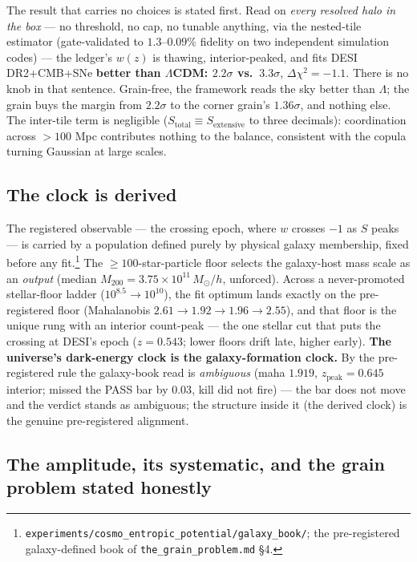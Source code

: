 \documentclass[11pt,a4paper]{article}
\begin{document}
The result that carries no choices is stated first. Read on \emph{every resolved halo in the box} --- no threshold, no cap, no tunable anything, via the nested-tile estimator (gate-validated to $1.3$--$0.09\%$ fidelity on two independent simulation codes) --- the ledger's $w(z)$ is thawing, interior-peaked, and fits DESI DR2+CMB+SNe \textbf{better than $\Lambda$CDM: $2.2\sigma$ vs.\ $3.3\sigma$}, $\Delta\chi^2 = -1.1$. There is no knob in that sentence. Grain-free, the framework reads the sky better than $\Lambda$; the grain buys the margin from $2.2\sigma$ to the corner grain's $1.36\sigma$, and nothing else. The inter-tile term is negligible ($S_{\text{total}} \equiv S_{\text{extensive}}$ to three decimals): coordination across $>100$ Mpc contributes nothing to the balance, consistent with the copula turning Gaussian at large scales.

\subsection*{The clock is derived}

The registered observable --- the crossing epoch, where $w$ crosses $-1$ as $S$ peaks --- is carried by a population defined purely by physical galaxy membership, fixed before any fit.\footnote{\texttt{experiments/cosmo\_entropic\_potential/galaxy\_book/}; the pre-registered galaxy-defined book of \texttt{the\_grain\_problem.md} \S4.} The $\ge 100$-star-particle floor selects the galaxy-host mass scale as an \emph{output} (median $M_{200} = 3.75\times10^{11}\,M_\odot/h$, unforced). Across a never-promoted stellar-floor ladder ($10^{8.5} \to 10^{10}$), the fit optimum lands exactly on the pre-registered floor (Mahalanobis $2.61 \to \mathbf{1.92} \to 1.96 \to 2.55$), and that floor is the unique rung with an interior count-peak --- the one stellar cut that puts the crossing at DESI's epoch ($z = 0.543$; lower floors drift late, higher early). \textbf{The universe's dark-energy clock is the galaxy-formation clock.} By the pre-registered rule the galaxy-book read is \emph{ambiguous} (maha $1.919$, $z_{\text{peak}} = 0.645$ interior; missed the PASS bar by $0.03$, kill did not fire) --- the bar does not move and the verdict stands as ambiguous; the structure inside it (the derived clock) is the genuine pre-registered alignment.

\subsection*{The amplitude, its systematic, and the grain problem stated honestly}
\end{document}
